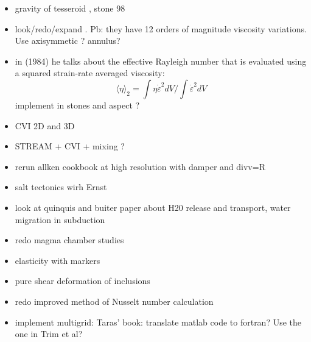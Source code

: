 \documentclass[a4paper]{article}
\begin{document}
\begin{itemize}
\item gravity of tesseroid , stone 98
\item look/redo/expand . Pb: they have 12 orders of magnitude viscosity variations.
Use axisymmetic ? annulus?

\item in \textcite{chri84} (1984) he talks about the effective Rayleigh number 
that is evaluated using a squared strain-rate averaged viscosity:
\[
\langle \eta \rangle_2 = \int \eta \dot{\varepsilon}^2 dV/\int \dot{\varepsilon}^2 dV
\]
implement in stones and aspect ?

\item CVI 2D and 3D

\item STREAM + CVI + mixing ?

\item rerun allken cookbook at high resolution with damper and divv=R
\item salt tectonics wirh Ernst \cite{veja92,dacl94,vasv93,maar96,istt04,maqs06,maqs07,bakp14,feka14a}

\item look at quinquis and buiter paper about H20 release and transport, water migration in subduction
\item redo magma chamber studies \cite{cuwi14,gehn18}


\item elasticity with markers
\item pure shear deformation of inclusions \cite{trla00}
\cite{haoc78,haoc81,riha84,zhon96,mohc98,zhzu00,lezh08,leha08,mofm07,mibb09,fope91,lizh13,bugo94} 
\item redo improved method of Nusselt number calculation \cite{hohr87}
\item implement multigrid: Taras' book: translate matlab code to fortran? Use the one in Trim et al?


\end{itemize}
\end{document}
